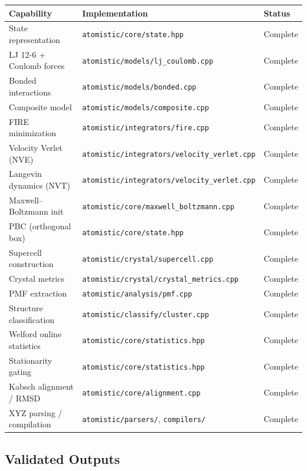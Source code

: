 \documentclass[11pt]{article}
\newcommand{\file}[1]{\texttt{#1}}
\begin{document}
\begin{center}
\begin{tabular}{lll}
\toprule
\textbf{Capability} & \textbf{Implementation} & \textbf{Status} \\
\midrule
State representation & \file{atomistic/core/state.hpp} & Complete \\
LJ 12-6 + Coulomb forces & \file{atomistic/models/lj\_coulomb.cpp} & Complete \\
Bonded interactions & \file{atomistic/models/bonded.cpp} & Complete \\
Composite model & \file{atomistic/models/composite.cpp} & Complete \\
FIRE minimization & \file{atomistic/integrators/fire.cpp} & Complete \\
Velocity Verlet (NVE) & \file{atomistic/integrators/velocity\_verlet.cpp} & Complete \\
Langevin dynamics (NVT) & \file{atomistic/integrators/velocity\_verlet.cpp} & Complete \\
Maxwell--Boltzmann init & \file{atomistic/core/maxwell\_boltzmann.cpp} & Complete \\
PBC (orthogonal box) & \file{atomistic/core/state.hpp} & Complete \\
Supercell construction & \file{atomistic/crystal/supercell.cpp} & Complete \\
Crystal metrics & \file{atomistic/crystal/crystal\_metrics.cpp} & Complete \\
PMF extraction & \file{atomistic/analysis/pmf.cpp} & Complete \\
Structure classification & \file{atomistic/classify/cluster.cpp} & Complete \\
Welford online statistics & \file{atomistic/core/statistics.hpp} & Complete \\
Stationarity gating & \file{atomistic/core/statistics.hpp} & Complete \\
Kabsch alignment / RMSD & \file{atomistic/core/alignment.cpp} & Complete \\
XYZ parsing / compilation & \file{atomistic/parsers/}, \file{compilers/} & Complete \\
\bottomrule
\end{tabular}
\end{center}

\subsection{Validated Outputs}
\end{document}
